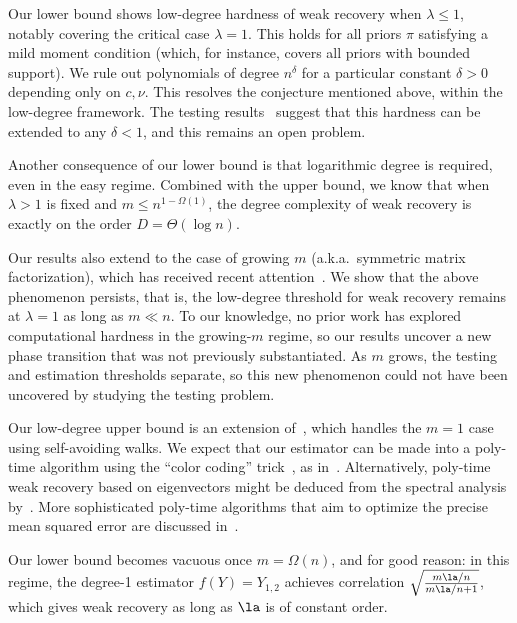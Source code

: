 \documentclass[11pt]{article}
\begin{document}
Our lower bound shows low-degree hardness of weak recovery when $\lambda \le 1$, notably covering the critical case $\lambda = 1$. This holds for all priors $\pi$ satisfying a mild moment condition (which, for instance, covers all priors with bounded support). We rule out polynomials of degree $n^\delta$ for a particular constant $\delta > 0$ depending only on $c,\nu$. This resolves the conjecture mentioned above, within the low-degree framework. The testing results~\cite{spectral-planting} suggest that this hardness can be extended to any $\delta < 1$, and this remains an open problem.

Another consequence of our lower bound is that logarithmic degree is required, even in the easy regime. Combined with the upper bound, we know that when $\lambda > 1$ is fixed and $m \le n^{1-\Omega(1)}$, the degree complexity of weak recovery is exactly on the order $D = \Theta(\log n)$.

Our results also extend to the case of growing $m$ (a.k.a.\ symmetric matrix factorization), which has received recent attention~\cite{meso,bun-rotational,extensive-rank,pbm24,semerjian,multiscale-cavity}. We show that the above phenomenon persists, that is, the low-degree threshold for weak recovery remains at $\lambda = 1$ as long as $m \ll n$. To our knowledge, no prior work has explored computational hardness in the growing-$m$ regime, so our results uncover a new phase transition that was not previously substantiated. As $m$ grows, the testing and estimation thresholds separate, so this new phenomenon could not have been uncovered by studying the testing problem.

Our low-degree upper bound is an extension of~\cite{HS-bayesian}, which handles the $m=1$ case using self-avoiding walks. We expect that our estimator can be made into a poly-time algorithm using the ``color coding'' trick~\cite{color-coding}, as in~\cite{HS-bayesian}. Alternatively, poly-time weak recovery based on eigenvectors might be deduced from the spectral analysis by~\cite{meso}. More sophisticated poly-time algorithms that aim to optimize the precise mean squared error are discussed in~\cite{bun-rotational,pbm24,semerjian}.

Our lower bound becomes vacuous once $m = \Omega(n)$, and for good reason: in this regime, the degree-1 estimator $f(Y)=Y_{1,2}$ achieves correlation $\sqrt{\frac{m\la/n}{m\la/n+1}}$, which gives weak recovery as long as $\la$ is of constant order.
\end{document}
